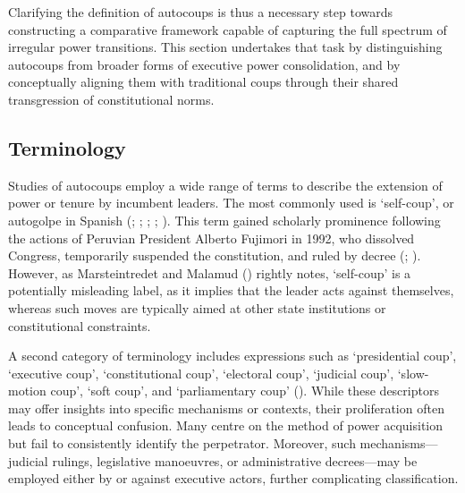 \documentclass[
  12pt,
]{report}
\begin{document}
Clarifying the definition of autocoups is thus a necessary step towards
constructing a comparative framework capable of capturing the full
spectrum of irregular power transitions. This section undertakes that
task by distinguishing autocoups from broader forms of executive power
consolidation, and by conceptually aligning them with traditional coups
through their shared transgression of constitutional norms.

\subsection*{Terminology}\label{terminology}

Studies of autocoups employ a wide range of terms to describe the
extension of power or tenure by incumbent leaders. The most commonly
used is `self-coup', or autogolpe in Spanish
(;
;
; ; ). This term gained scholarly prominence following the actions of
Peruvian President Alberto Fujimori in 1992, who dissolved Congress,
temporarily suspended the constitution, and ruled by decree
(;
). However, as
Marsteintredet and Malamud ()
rightly notes, `self-coup' is a potentially misleading label, as it
implies that the leader acts against themselves, whereas such moves are
typically aimed at other state institutions or constitutional
constraints.

A second category of terminology includes expressions such as
`presidential coup', `executive coup', `constitutional coup', `electoral
coup', `judicial coup', `slow-motion coup', `soft coup', and
`parliamentary coup' (). While these descriptors may offer insights into
specific mechanisms or contexts, their proliferation often leads to
conceptual confusion. Many centre on the method of power acquisition but
fail to consistently identify the perpetrator. Moreover, such
mechanisms---judicial rulings, legislative manoeuvres, or administrative
decrees---may be employed either by or against executive actors, further
complicating classification.
\end{document}
